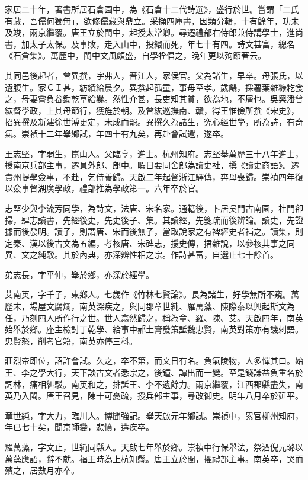 \begin{pinyinscope}
家居二十年，著書所居石倉園中，為《石倉十二代詩選》，盛行於世。嘗謂「二氏有藏，吾儒何獨無」，欲修儒藏與鼎立。采擷四庫書，因類分輯，十有餘年，功未及竣，兩京繼覆。唐王立於閩中，起授太常卿。尋遷禮部右侍郎兼侍講學士，進尚書，加太子太保。及事敗，走入山中，投繯而死，年七十有四。詩文甚富，總名《石倉集》。萬歷中，閩中文風頗盛，自學牷倡之，晚年更以殉節著云。

其同邑後起者，曾異撰，字弗人，晉江人，家侯官。父為諸生，早卒。母張氏，以遺腹生。家ＣＩ甚，紡績給晨夕。異撰起孤童，事母至孝。歲饑，採薯葉雜糠籺食之，母妻嘗負畚鋤乾草給爨。然性介甚，長吏知其貧，欲為地，不屑也。吳興潘曾紘督學政，上其母節行，獲旌於朝。及曾紘巡撫南、贛，得王惟儉所撰《宋史》，招異撰及新建徐世溥更定，未成而罷。異撰久為諸生，究心經世學，所為詩，有奇氣。崇禎十二年舉鄉試，年四十有九矣，再赴會試還，遂卒。

王志堅，字弱生，崑山人。父臨亨，進士。杭州知府。志堅舉萬歷三十八年進士，授南京兵部主事，遷員外郎、郎中。暇日要同舍郎為讀史社，撰《讀史商語》。遷貴州提學僉事，不赴，乞侍養歸。天啟二年起督浙江驛傳，奔母喪歸。崇禎四年復以僉事督湖廣學政，禮部推為學政第一。六年卒於官。

志堅少與李流芳同學，為詩文，法唐、宋名家。通籍後，卜居吳門古南園，杜門卻掃，肆志讀書，先經後史，先史後子、集。其讀經，先箋疏而後辨論。讀史，先證據而後發明。讀子，則謂唐、宋而後無子，當取說家之有裨經史者補之。讀集，則定秦、漢以後古文為五編，考核唐、宋碑志，援史傳，捃雜說，以參核其事之同異、文之純駁。其於內典，亦深辨性相之宗。作詩甚富，自選止七十餘首。

弟志長，字平仲，舉於鄉，亦深於經學。

艾南英，字千子，東鄉人。七歲作《竹林七賢論》。長為諸生，好學無所不窺。萬歷末，場屋文腐爛，南英深疾之，與同郡章世純、羅萬藻、陳際泰以興起斯文為任，乃刻四人所作行之世。世人翕然歸之，稱為章、羅、陳、艾。天啟四年，南英始舉於鄉。座主檢討丁乾學、給事中郝土膏發策詆魏忠賢，南英對策亦有譏刺語。忠賢怒，削考官籍，南英亦停三科。

莊烈帝即位，詔許會試。久之，卒不第，而文日有名。負氣陵物，人多憚其口。始王、李之學大行，天下談古文者悉宗之，後鐘、譚出而一變。至是錢謙益負重名於詞林，痛相糾駁。南英和之，排詆王、李不遺餘力。兩京繼覆，江西郡縣盡失，南英乃入閩。唐王召見，陳十可憂疏，授兵部主事，尋改御史。明年八月卒於延平。

章世純，字大力，臨川人。博聞強記。舉天啟元年鄉試。崇禎中，累官柳州知府，年已七十矣，聞京師變，悲憤，遘疾卒。

羅萬藻，字文止，世純同縣人。天啟七年舉於鄉。崇禎中行保舉法，祭酒倪元璐以萬藻應詔，辭不就。福王時為上杭知縣。唐王立於閩，擢禮部主事。南英卒，哭而殯之，居數月亦卒。


\end{pinyinscope}
